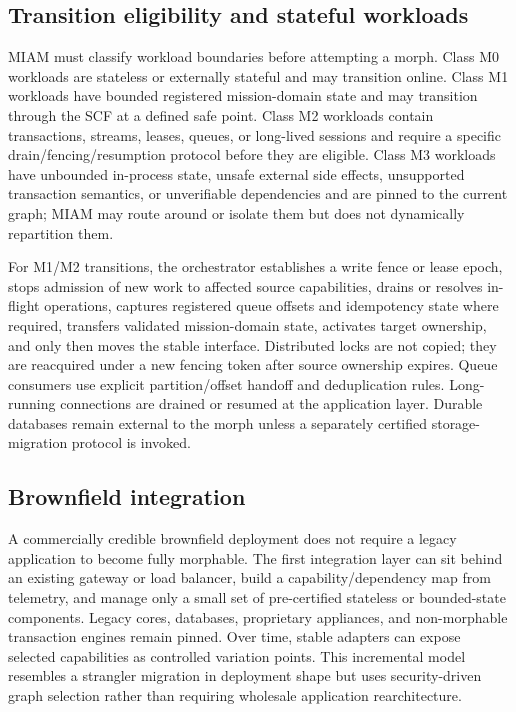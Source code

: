 \documentclass[11pt,letterpaper]{article}
\begin{document}
\subsection{Transition eligibility and stateful workloads}

MIAM must classify workload boundaries before attempting a morph. Class M0 workloads are stateless or externally stateful and may transition online. Class M1 workloads have bounded registered mission-domain state and may transition through the SCF at a defined safe point. Class M2 workloads contain transactions, streams, leases, queues, or long-lived sessions and require a specific drain/fencing/resumption protocol before they are eligible. Class M3 workloads have unbounded in-process state, unsafe external side effects, unsupported transaction semantics, or unverifiable dependencies and are pinned to the current graph; MIAM may route around or isolate them but does not dynamically repartition them.

For M1/M2 transitions, the orchestrator establishes a write fence or lease epoch, stops admission of new work to affected source capabilities, drains or resolves in-flight operations, captures registered queue offsets and idempotency state where required, transfers validated mission-domain state, activates target ownership, and only then moves the stable interface. Distributed locks are not copied; they are reacquired under a new fencing token after source ownership expires. Queue consumers use explicit partition/offset handoff and deduplication rules. Long-running connections are drained or resumed at the application layer. Durable databases remain external to the morph unless a separately certified storage-migration protocol is invoked.

\subsection{Brownfield integration}

A commercially credible brownfield deployment does not require a legacy application to become fully morphable. The first integration layer can sit behind an existing gateway or load balancer, build a capability/dependency map from telemetry, and manage only a small set of pre-certified stateless or bounded-state components. Legacy cores, databases, proprietary appliances, and non-morphable transaction engines remain pinned. Over time, stable adapters can expose selected capabilities as controlled variation points. This incremental model resembles a strangler migration in deployment shape but uses security-driven graph selection rather than requiring wholesale application rearchitecture.
\end{document}
